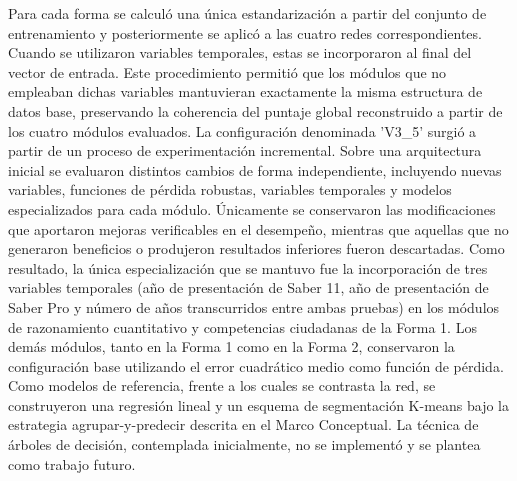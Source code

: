 Para cada forma se calculó una única estandarización a partir del conjunto de entrenamiento y posteriormente se aplicó a las cuatro redes correspondientes. Cuando se utilizaron variables temporales, estas se incorporaron al final del vector de entrada. Este procedimiento permitió que los módulos que no empleaban dichas variables mantuvieran exactamente la misma estructura de datos base, preservando la coherencia del puntaje global reconstruido a partir de los cuatro módulos evaluados. La configuración denominada 'V3\_5' surgió a partir de un proceso de experimentación incremental. Sobre una arquitectura inicial se evaluaron distintos cambios de forma independiente, incluyendo nuevas variables, funciones de pérdida robustas, variables temporales y modelos especializados para cada módulo. Únicamente se conservaron las modificaciones que aportaron mejoras verificables en el desempeño, mientras que aquellas que no generaron beneficios o produjeron resultados inferiores fueron descartadas. Como resultado, la única especialización que se mantuvo fue la incorporación de tres variables temporales (año de presentación de Saber 11, año de presentación de Saber Pro y número de años transcurridos entre ambas pruebas) en los módulos de razonamiento cuantitativo y competencias ciudadanas de la Forma 1. Los demás módulos, tanto en la Forma 1 como en la Forma 2, conservaron la configuración base utilizando el error cuadrático medio como función de pérdida.
Como modelos de referencia, frente a los cuales se contrasta la red, se construyeron una regresión lineal y un esquema de segmentación K-means bajo la estrategia agrupar-y-predecir descrita en el Marco Conceptual. La técnica de árboles de decisión, contemplada inicialmente, no se implementó y se plantea como trabajo futuro.

